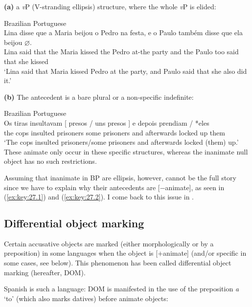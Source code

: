 \documentclass[output=paper]{langsci/langscibook}
\begin{document}
\noindent\textbf{(a)} a \emph{v}P  (V-stranding ellipsis) structure, where the whole
\emph{v}P is elided:

\ea\label{ex:key:27.8} Brazilian Portuguese\\
    \gll Lina disse  que   a   Maria beijou   o Pedro na         festa, e o   Paulo também disse que ela  beijou \textbf{$\varnothing$}.\\
         Lina said    that the Maria kissed   the   Pedro   at-the   party and the Paulo too       said   that  she kissed\\
    \glt    `Lina said that Maria kissed Pedro at the party, and Paulo said that she also did it.'
\z

\noindent\textbf{(b)} The antecedent is a bare plural or a non-specific
indefinite:

\ea\label{ex:key:27.9} Brazilian Portuguese\\
    \gll    Os tiras  insultavam [ presos / uns presos ] e depois   prendiam \underline{\hphantom{eles}} / *eles\\
            the cops   insulted {} prisoners {} some prisoners {} and afterwards {locked up} {} {} \hphantom{*}them\\
    \glt    `The cops insulted prisoners/some prisoners and afterwards locked (them) up.'
\z
These animate  only occur in these specific structures, whereas the
inanimate null object has no such restrictions.

Assuming that inanimate  in \gls{BP} are
ellipsis, however, cannot be the full story since we have to explain why their
antecedents are [$-$animate], as seen in
(\ref{ex:key:27.1}) and (\ref{ex:key:27.2}). I come back to this issue in
.

\subsection{Differential object marking}\label{sec:key:27.2.2}

Certain accusative objects are marked (either morphologically or by a
preposition) in some languages when the object is [$+$animate] (and/or specific
in some cases, see below). This phenomenon has been called differential object
marking (hereafter, DOM).

Spanish is such a language: DOM is manifested in the use of the preposition
\emph{a} `to' (which also marks datives) before animate objects:
\end{document}
